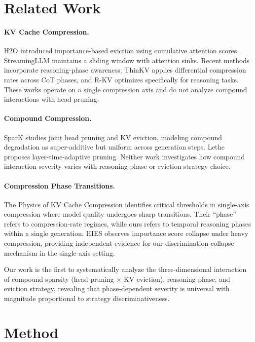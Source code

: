 \documentclass[11pt,a4paper]{article}
\begin{document}
\section{Related Work}

\paragraph{KV Cache Compression.}
H2O \citep{h2o2023} introduced importance-based eviction using cumulative attention scores. StreamingLLM \citep{streamingllm2023} maintains a sliding window with attention sinks. Recent methods incorporate reasoning-phase awareness: ThinKV \citep{thinkv2025} applies differential compression rates across CoT phases, and R-KV \citep{rkv2025} optimizes specifically for reasoning tasks. These works operate on a single compression axis and do not analyze compound interactions with head pruning.

\paragraph{Compound Compression.}
SparK \citep{spark2024} studies joint head pruning and KV eviction, modeling compound degradation as super-additive but uniform across generation steps. Lethe \citep{lethe2026} proposes layer-time-adaptive pruning. Neither work investigates how compound interaction severity varies with reasoning phase or eviction strategy choice.

\paragraph{Compression Phase Transitions.}
The Physics of KV Cache Compression \citep{physicskv2026} identifies critical thresholds in single-axis compression where model quality undergoes sharp transitions. Their ``phase'' refers to compression-rate regimes, while ours refers to temporal reasoning phases within a single generation. HIES \citep{hies2025} observes importance score collapse under heavy compression, providing independent evidence for our discrimination collapse mechanism in the single-axis setting.

Our work is the first to systematically analyze the three-dimensional interaction of compound sparsity (head pruning $\times$ KV eviction), reasoning phase, and eviction strategy, revealing that phase-dependent severity is universal with magnitude proportional to strategy discriminativeness.

\section{Method}
\end{document}

